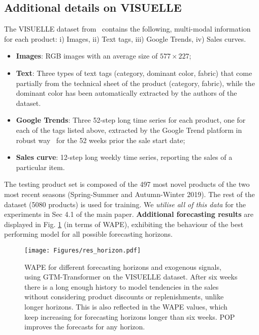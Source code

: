 \documentclass[runningheads]{llncs}
\begin{document}
\subsection{Additional details on VISUELLE}\label{sec:visuelle}
The VISUELLE dataset from~\cite{skenderi2021well} contains the following, multi-modal information for each product: i) Images, ii) Text tags, iii) Google Trends, iv) Sales curves. 
 \begin{itemize}[noitemsep, leftmargin=*]
     \item{\textbf{Images}}: RGB images with an average size of $577\times 227$; 
     \item{\textbf{Text}}: Three types of text tags (category, dominant color, fabric) that come partially from the technical sheet of the product (category, fabric), while the dominant color has been automatically extracted by the authors of the dataset.
     \item{\textbf{Google Trends}}: Three 52-step long time series for each product, one for each of the tags listed above, extracted by the Google Trend platform in robust way~\cite{medeiros2021proper} for the 52 weeks prior the sale start date;
     \item{\textbf{Sales curve}}: 12-step long weekly time series, reporting the sales of a particular item.
 \end{itemize}
 The testing product set is composed of the 497 most novel products of the two most recent seasons (Spring-Summer and Autumn-Winter 2019). The rest of the dataset (5080 products) is used for training. We \emph{utilise all of this data} for the experiments in Sec 4.1 of the main paper.
 \textbf{Additional forecasting results} are displayed in Fig. \ref{fig:result_horizon} (in terms of WAPE), exhibiting the behaviour of the best performing model for all possible forecasting horizons.
 \begin{figure}[h!]
    \centering
    \texttt{[image: Figures/res\_horizon.pdf]}
    \caption{WAPE for different forecasting horizons and exogenous signals, using GTM-Transformer \cite{skenderi2021well} on the VISUELLE dataset. After six weeks there is a long enough history to model tendencies in the sales without considering product discounts or replenishments, unlike longer horizons. This is also reflected in the WAPE values, which keep increasing for forecasting horizons longer than six weeks. POP improves the forecasts for any horizon.}
    \label{fig:result_horizon}
\end{figure}
 
\end{document}
